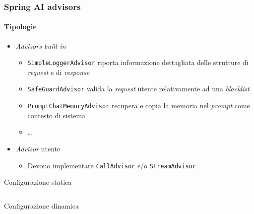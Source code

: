 %
\begin{frame}[t,fragile] \frametitle{Spring AI advisors}
    \framesubtitle{Tipologie}
    \vspace*{-.7cm}
    {\footnotesize
    \begin{itemize}[leftmargin=10pt,align=right]
        \item[\alert{\faArrowCircleRight}] \textit{Advisors built-in}
        \begin{itemize}[leftmargin=10pt,align=right]
            \item[\alert{\faArrowCircleRight}] \alert{\texttt{SimpleLoggerAdvisor}} riporta informazione dettagliata delle strutture di \textit{request} e di \textit{response}
            \item[\alert{\faArrowCircleRight}] \alert{\texttt{SafeGuardAdvisor}} valida la \textit{request} utente relativamente ad una \textit{blacklist}
            \item[\alert{\faArrowCircleRight}] \alert{\texttt{PromptChatMemoryAdvisor}} recupera e copia la memoria nel \textit{prompt} come contesto di sistema 
            \item[\alert{\faArrowCircleRight}] \ldots
        \end{itemize}
        \item[\alert{\faArrowCircleRight}] \textit{Advisor} utente
        \begin{itemize}[leftmargin=10pt,align=right]
            \item[\alert{\faArrowCircleRight}] Devono implementare \texttt{CallAdvisor} \alert{e/o} \texttt{StreamAdvisor}
        \end{itemize}
    \end{itemize}
    \begin{block}{Configurazione statica}
		{\tiny\inputminted{java}{code/DefaultAdvisorsExample.java}}
    \end{block}
    \begin{block}{Configurazione dinamica}
		{\tiny\inputminted{java}{code/AdvisorsExample.java}}
    \end{block}
    }
\end{frame}
%
